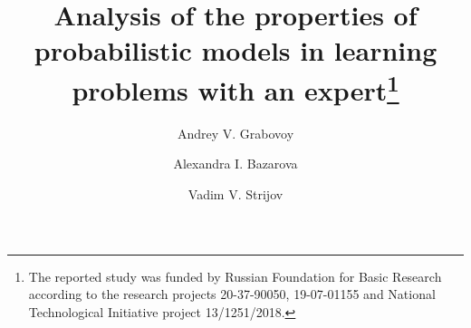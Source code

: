 %
%
%
%
%
\RequirePackage{fix-cm}
%
\documentclass[smallextended]{svjour3}       %
%
\smartqed  %
%
\usepackage{graphicx}
\usepackage{subfig}
\usepackage{amsmath}
\usepackage{amsfonts}
%
%
%
%
%


\title{Analysis of the properties of probabilistic models in learning problems with an expert\thanks{The reported study was funded by Russian Foundation for Basic Research according to the research projects 20-37-90050, 19-07-01155 and National Technological Initiative project 13/1251/2018.}
}
\subtitle{}


\author{Andrey V. Grabovoy        \and
            Alexandra I. Bazarova  \and
            Vadim V. Strijov
}

